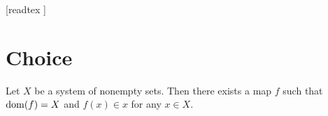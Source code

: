 \documentclass[10pt]{article}
\begin{document}
  \begin{imports}
    \begin{forthel}
      [readtex ]
    \end{forthel}
  \end{imports}


  \section{Choice}

  \begin{forthel}
    \begin{axiom}
      Let $X$ be a system of nonempty sets.
      Then there exists a map $f$ such that $\operatorname{dom}(f) = X$ and $f(x) \in x$ for any $x \in X$.
    \end{axiom}
  \end{forthel}
\end{document}
